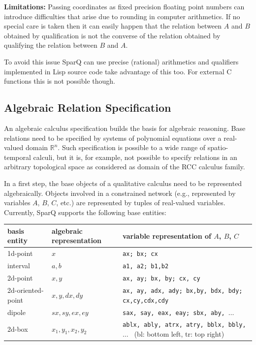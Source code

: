 \documentclass[headsepline]{scrreprt}
\theoremstyle{definition}
\newcommand{\engine}{SparQ}
\begin{document}
\medskip
{\bf Limitations:} Passing coordinates as fixed precision floating point numbers can introduce difficulties that arise due to rounding in computer arithmetics. If no special care is taken then it can easily happen that the relation between $A$ and $B$ obtained by qualification is not the converse of the relation obtained by qualifying the relation between $B$ and $A$.

To avoid this issue \engine{} can use precise (rational) arithmetics and qualifiers implemented in Lisp source code take advantage of this too. For external C functions this is not possible though.

\subsection{Algebraic Relation Specification}
An algebraic calculus specification builds the basis for algebraic reasoning. Base relations need to be specified by systems of polynomial equations over a real-valued domain $\mathbb{R}^n$. Such specification is possible to a wide range of spatio-temporal calculi, but it is, for example, not possible to specify relations in an arbitrary topological space as considered as domain of the RCC calculus family. 

In a first step, the base objects of a qualitative calculus need to be represented algebraically.
Objects involved in a constrained network (e.g., represented by variables $A$, $B$, $C$, etc.) are represented by tuples of real-valued variables. Currently, \engine{} supports the following base entities:

\begin{center}
\begin{tabular}{|llp{69mm}|}
\hline
basis entity & algebraic representation & variable representation of $A$, $B$, $C$\\ \hline \hline
1d-point & $x$ & {\tt ax;\hspace*{1em} bx;\hspace*{1em} cx}\\ 
interval & $a, b$ & {\tt a1, a2;\hspace*{1em} b1,b2}\\
2d-point & $x, y$ & {\tt ax, ay;\hspace*{1em} bx, by;\hspace*{1em} cx, cy}\\ 
2d-oriented-point & $x, y, dx, dy$ & {\tt ax, ay, adx, ady;\hspace*{1em} bx,by, bdx, bdy;\hspace*{1em} cx,cy,cdx,cdy}\\ 
dipole & $sx, sy, ex, ey$ & {\tt sax, say, eax, eay; \hspace*{1em} sbx, aby, $\ldots$ }\\
2d-box & $x_1,y_1,x_2,y_2$ & {\tt ablx, ably, atrx, atry, \hspace*{1em} bblx, bbly, $\ldots$ } (bl: bottom left, tr: top right)
\\
\hline
\end{tabular}
\end{center}
\end{document}

